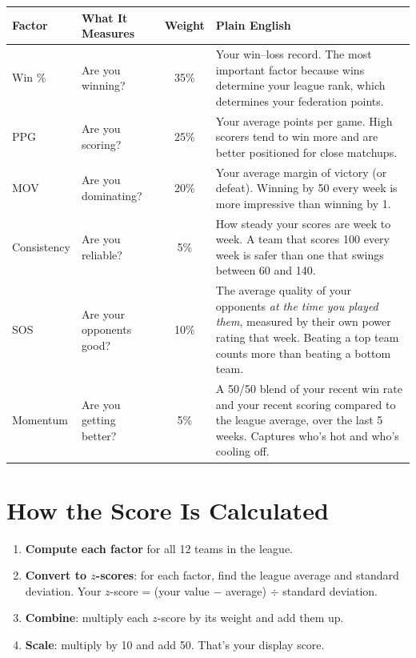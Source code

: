 \documentclass[11pt,letterpaper]{article}
\newcommand{\rowalt}{\rowcolor{fedlight}}
\begin{document}
\begin{table}[H]
\centering
\small
\begin{tabular}{@{}llcp{7.2cm}@{}}
\toprule
\textbf{Factor} & \textbf{What It Measures} & \textbf{Weight} & \textbf{Plain English} \\
\midrule
\rowalt Win \% & Are you winning? & 35\% & Your win--loss record. The most important factor because wins determine your league rank, which determines your federation points. \\
PPG & Are you scoring? & 25\% & Your average points per game. High scorers tend to win more and are better positioned for close matchups. \\
\rowalt MOV & Are you dominating? & 20\% & Your average margin of victory (or defeat). Winning by 50 every week is more impressive than winning by 1. \\
Consistency & Are you reliable? & 5\% & How steady your scores are week to week. A team that scores 100 every week is safer than one that swings between 60 and 140. \\
\rowalt SOS & Are your opponents good? & 10\% & The average quality of your opponents \emph{at the time you played them}, measured by their own power rating that week. Beating a top team counts more than beating a bottom team. \\
Momentum & Are you getting better? & 5\% & A 50/50 blend of your recent win rate and your recent scoring compared to the league average, over the last 5 weeks. Captures who's hot and who's cooling off. \\
\bottomrule
\end{tabular}
\end{table}

\section{How the Score Is Calculated}

\begin{enumerate}[nosep, leftmargin=1.5em]
\item \textbf{Compute each factor} for all 12 teams in the league.
\item \textbf{Convert to $z$-scores}: for each factor, find the league average and standard deviation. Your $z$-score = (your value $-$ average) $\div$ standard deviation.
\item \textbf{Combine}: multiply each $z$-score by its weight and add them up.
\item \textbf{Scale}: multiply by 10 and add 50. That's your display score.
\end{enumerate}
\end{document}
